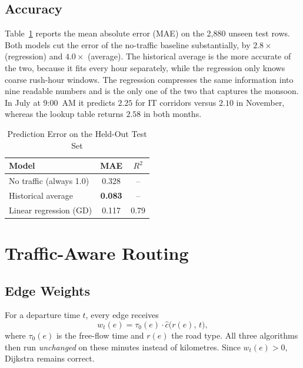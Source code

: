 \documentclass[conference]{IEEEtran}
\begin{document}
\subsection{Accuracy}
Table~\ref{tab:accuracy} reports the mean absolute error (MAE) on the
2{,}880 unseen test rows. Both models cut the error of the no-traffic
baseline substantially, by $2.8\times$ (regression) and $4.0\times$ (average). The historical average is
the more accurate of the two, because it fits every hour separately,
while the regression only knows coarse rush-hour windows. The regression
compresses the same information into nine readable numbers and is the
only one of the two that captures the monsoon. In July at 9:00~AM it
predicts $2.25$ for IT corridors versus $2.10$ in November, whereas the
lookup table returns $2.58$ in both months.

\begin{table}[t]
\caption{Prediction Error on the Held-Out Test Set}
\label{tab:accuracy}
\centering
\begin{tabular}{@{}lcc@{}}
\toprule
Model & MAE & $R^2$ \\
\midrule
No traffic (always 1.0)  & 0.328 & -- \\
Historical average       & \textbf{0.083} & -- \\
Linear regression (GD)   & 0.117 & 0.79 \\
\bottomrule
\end{tabular}
\end{table}

\section{Traffic-Aware Routing}\label{sec:tdrouting}

\subsection{Edge Weights}
For a departure time $t$, every edge receives
\begin{equation}
  w_t(e) = \tau_0(e)\cdot \hat{c}\big(r(e),\,t\big),
\end{equation}
where $\tau_0(e)$ is the free-flow time and $r(e)$ the road type. All
three algorithms then run \emph{unchanged} on these minutes instead of
kilometres. Since $w_t(e) > 0$, Dijkstra remains correct.
\end{document}
